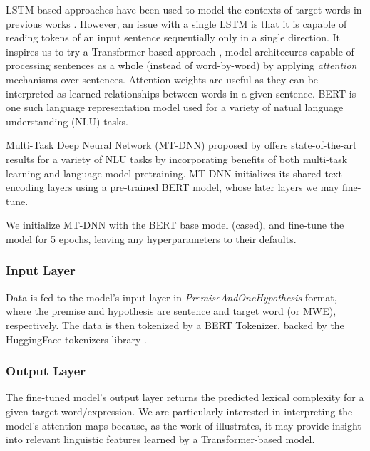 \documentclass[11pt,a4paper]{article}
\begin{document}
LSTM-based approaches have been used to model the contexts of target words in previous works \citep{hartmanndossantos2018nilc, dehertogtack2018deep}. However, an issue with a single LSTM is that it is capable of reading tokens of an input sentence sequentially only in a single direction. It inspires us to try a Transformer-based approach \citep{DBLP:journals/corr/VaswaniSPUJGKP17}, model architecures capable of processing sentences as a whole (instead of word-by-word) by applying \textit{attention} mechanisms over sentences. Attention weights are useful as they can be interpreted as learned relationships between words in a given sentence. BERT \citep{DBLP:journals/corr/abs-1810-04805} is one such language representation model used for a variety of natual language understanding (NLU) tasks.

Multi-Task Deep Neural Network (MT-DNN) proposed by \citet{liuetal2019multitask} offers state-of-the-art results for a variety of NLU tasks by incorporating benefits of both multi-task learning and language model-pretraining. MT-DNN initializes its shared text encoding layers using a pre-trained BERT model, whose later layers we may fine-tune.

We initialize MT-DNN with the BERT base model (cased), and fine-tune the model for 5 epochs, leaving any hyperparameters to their defaults.

\subsubsection{Input Layer}

Data is fed to the model's input layer in \textit{PremiseAndOneHypothesis} format, where the premise and hypothesis are sentence and target word (or MWE), respectively. The data is then tokenized by a BERT Tokenizer, backed by the HuggingFace tokenizers library \citep{wolf_etal_2020_transformers}.

\subsubsection{Output Layer}

The fine-tuned model's output layer returns the predicted lexical complexity for a given target word/expression. We are particularly interested in interpreting the model's attention maps because, as the work of \citep{DBLP:journals/corr/abs-1906-04341} illustrates, it may provide insight into relevant linguistic features learned by a Transformer-based model.
\end{document}
